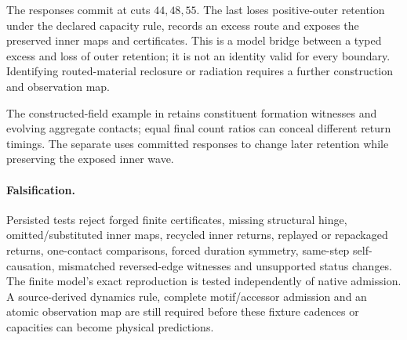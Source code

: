 The responses commit at cuts \(44,48,55\). The last loses positive-outer retention under the declared capacity rule, records an excess route and exposes the preserved inner maps and certificates. This is a model bridge between a typed excess and loss of outer retention; it is not an identity valid for every boundary. Identifying routed-material reclosure or radiation requires a further construction and observation map.

The constructed-field example in  retains
constituent formation witnesses and evolving aggregate contacts; equal final
count ratios can conceal different return timings. The separate
 uses committed responses to change later
retention while preserving the exposed inner wave.

\paragraph{Falsification.}
Persisted tests reject forged finite certificates, missing structural hinge, omitted/substituted inner maps, recycled inner returns, replayed or repackaged returns, one-contact comparisons, forced duration symmetry, same-step self-causation, mismatched reversed-edge witnesses and unsupported status changes. The finite model's exact reproduction is tested independently of native admission. A source-derived dynamics rule, complete motif/accessor admission and an atomic observation map are still required before these fixture cadences or capacities can become physical predictions.


